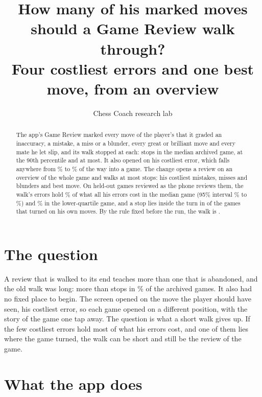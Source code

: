 \documentclass[11pt]{article}
\title{How many of his marked moves should a Game Review walk through?\\[0.3em]
\large Four costliest errors and one best move, from an overview}
\author{Chess Coach research lab}
\date{}
\begin{document}
\maketitle

\begin{abstract}
The app's Game Review marked every move of the player's that it graded an inaccuracy, a mistake,
a miss or a blunder, every great or brilliant move and every mate he let slip, and its walk
stopped at each: \DesignMomentsMedian{} stops in the median archived game, \DesignMomentsNinety{}
at the 90th percentile and \DesignMomentsMost{} at most. It also opened on his costliest error,
which falls anywhere from \DesignSeenAtLow\% to \DesignSeenAtHigh\% of the way into a game. The
change opens a review on an overview of the whole game and walks at most \MaxStops{} stops: his
\MaxErrors{} costliest mistakes, misses and blunders and \MaxHonors{} best move. On
\HeldGames{} held-out games reviewed as the phone reviews them, the walk's errors hold
\HeldCoverage\% of what all his errors cost in the median game (95\% interval \HeldCoverageLow\%
to \HeldCoverageHigh\%) and \HeldQuartile\% in the lower-quartile game, and a stop lies inside
the turn in \HeldTurnIn{} of the \HeldTurnOf{} games that turned on his own moves. By the rule
fixed before the run, the walk is \Kept.
\end{abstract}

\section{The question}

A review that is walked to its end teaches more than one that is abandoned, and the old walk was
long: more than \LongWalk{} stops in \DesignLonger\% of the archived games. It also had no fixed
place to begin. The screen opened on the move the player should have seen, his costliest error,
so each game opened on a different position, with the story of the game one tap away. The
question is what a short walk gives up. If the few costliest errors hold most of what his errors
cost, and one of them lies where the game turned, the walk can be short and still be the review
of the game.

\section{What the app does}
\end{document}
